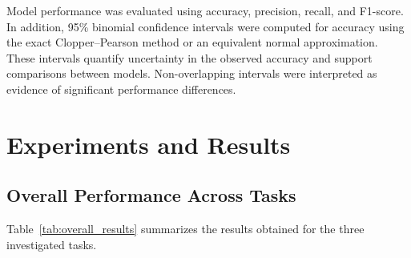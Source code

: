 Model performance was evaluated using accuracy, precision, recall, and F1-score. In addition, 95\% binomial confidence intervals were computed for accuracy using the exact Clopper--Pearson method or an equivalent normal approximation. These intervals quantify uncertainty in the observed accuracy and support comparisons between models. Non-overlapping intervals were interpreted as evidence of significant performance differences.

\section{Experiments and Results}

\subsection{Overall Performance Across Tasks}

Table~\ref{tab:overall_results} summarizes the results obtained for the three investigated tasks.

